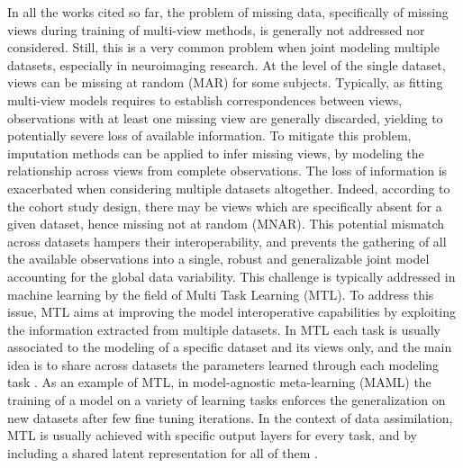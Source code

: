 % 
In all the works cited so far, the problem of missing data, specifically of missing views during training of multi-view methods, is generally not addressed nor considered.
Still, this is a very common problem when joint modeling multiple datasets, especially in neuroimaging research.
At the level of the single dataset, views can be missing at random (MAR) for some subjects.
Typically, as fitting multi-view models requires to establish correspondences between views, observations with at least one missing view are generally discarded, yielding to potentially severe loss of available information.
To mitigate this problem, imputation methods can be applied to infer missing views, by modeling the relationship across views from complete observations.
%
The loss of information is exacerbated when considering multiple datasets altogether.
Indeed, according to the cohort study design, there may be views which are specifically absent for a given dataset, hence missing not at random (MNAR).
This potential mismatch across datasets hampers their interoperability,
and prevents the gathering of all the available observations into a single, robust and generalizable joint model accounting for the global data variability.
%
This challenge is typically addressed in machine learning by the field of Multi Task Learning (MTL).
To address this issue, MTL aims at improving the model interoperative capabilities by exploiting the information extracted from multiple datasets.
In MTL each task is usually associated to the modeling of a specific dataset and its views only,
and the main idea is to share across datasets the parameters learned through each modeling task \citep{Caruana1998, Dorado-Moreno2020}.
As an example of MTL, in model-agnostic meta-learning (MAML) \citep{MAML1} the training of a model on a variety of learning tasks enforces the generalization on new datasets after few fine tuning iterations.
%
In the context of data assimilation, MTL is usually achieved with specific output layers for every task, and by including a shared latent representation for all of them \citep{Dorado-Moreno2020}.
